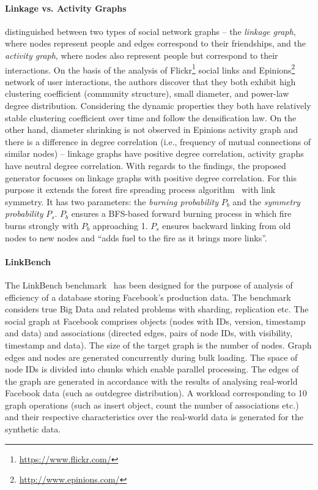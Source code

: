\paragraph{Linkage vs. Activity Graphs} \cite{Yao2011} distinguished between two
types of social network graphs -- the \emph{linkage graph}, where nodes represent people and edges correspond to their friendships, and the \emph{activity graph}, where nodes also represent people but correspond to their interactions. On the basis of the analysis of
Flickr\footnote{\url{https://www.flickr.com/}} social links and
Epinions\footnote{\url{http://www.epinions.com/}} network of user interactions, the authors discover that they both exhibit high clustering coefficient (community structure), small diameter, and power-law degree distribution. Considering the dynamic properties they both have relatively stable clustering coefficient over time and follow the densification law. On the other hand, diameter shrinking is not observed in Epinions activity graph and there is a difference in degree
correlation (i.e., frequency of mutual connections of similar nodes) -- linkage graphs have positive degree correlation, activity graphs have neutral degree correlation. With regards to the findings, the proposed generator focusses on linkage graphs with positive degree correlation. For this purpose it extends the forest fire spreading process algorithm~\cite{Leskovec:2005:GOT:1081870.1081893} with link symmetry. It has two parameters: the \emph{burning probability} $P_b$ and the \emph{symmetry probability} $P_s$. $P_b$ ensures a BFS-based forward burning process in which fire burns strongly with $P_b$ approaching 1.  $P_s$ ensures backward linking from old nodes to new nodes and ``adds fuel to the fire as it brings more links''. %


\paragraph{LinkBench} The LinkBench
benchmark~\cite{Armstrong:2013:LDB:2463676.2465296} has been designed for the purpose of analysis of efficiency of a database storing Facebook's production data. The benchmark considers true Big Data and related problems with sharding, replication etc. The social graph at Facebook comprises objects (nodes with IDs, version, timestamp and data) and associations (directed edges, pairs of node IDs, with visibility, timestamp and data). The size of the target graph is the number of nodes. Graph edges and nodes are generated concurrently during bulk loading. The space of node IDs is divided into chunks which enable parallel processing. The edges of the graph are generated in accordance with the results of analysing  real-world Facebook data (such as outdegree distribution). A workload corresponding to 10 graph operations (such as insert object, count the number of associations etc.) and their respective characteristics over the real-world data is generated for the synthetic data.

